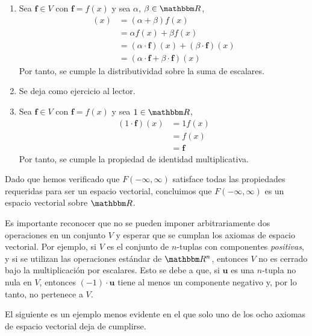 \begin{examplebox}{}{}
\begin{enumerate}[label=\roman*), topsep=6pt, itemsep=0pt]
        \item Sea $\mathbf{f} \in V$ con $\mathbf{f} = f(x)$ y sea $\alpha$, $\beta \in \RR$,
        \begin{align*}
            [(\alpha + \beta) \cdot \mathbf{f}](x) & = (\alpha + \beta) f(x) \\
            & = \alpha f(x) + \beta f(x) \\
            & = (\alpha \cdot \mathbf{f})(x) + (\beta \cdot \mathbf{f})(x) \\
            & = (\alpha \cdot \mathbf{f} + \beta \cdot \mathbf{f})(x)
        \end{align*}
        Por tanto, se cumple la distributividad sobre la suma de escalares.
        \item Se deja como ejercicio al lector.
        \item Sea $\mathbf{f} \in V$ con $\mathbf{f} = f(x)$ y sea $1 \in \RR$,
        \begin{align*}
            (1 \cdot \mathbf{f})(x) & = 1 f(x) \\
            & = f(x) \\
            & = \mathbf{f}
        \end{align*}
        Por tanto, se cumple la propiedad de identidad multiplicativa.
    \end{enumerate}
    Dado que hemos verificado que $F(-\infty, \infty)$ satisface todas las propiedades requeridas para ser un espacio vectorial, concluimos que $F(-\infty, \infty)$ es un espacio vectorial sobre $\RR$.
\end{examplebox}

Es importante reconocer que no se pueden imponer arbitrariamente dos operaciones en un conjunto $V$ y esperar que se cumplan los axiomas de espacio vectorial. Por ejemplo, si $V$ es el conjunto de $n$-tuplas con componentes \emph{positivas}, y si se utilizan las operaciones estándar de $\RR[n]$, entonces $V$ no es cerrado bajo la multiplicación por escalares. Esto se debe a que, si $\mathbf{u}$ es una $n$-tupla no nula en $V$, entonces $(-1) \cdot \mathbf{u}$ tiene al menos un componente negativo y, por lo tanto, no pertenece a $V$.

El siguiente es un ejemplo menos evidente en el que solo uno de los ocho axiomas de espacio vectorial deja de cumplirse.

